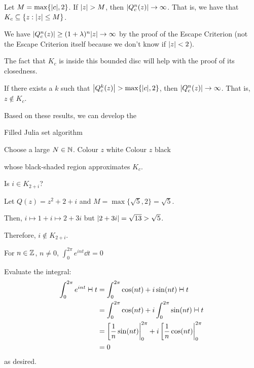 \documentclass[class=pmath370,tikz,notes]{agony}
\begin{document}
\begin{corollary}
  Let $M = \max\{\abs{c}, 2\}$.
  If $\abs{z} > M$, then $\abs{Q_c^n(z)} \to \infty$.
  That is, we have that $K_c \subseteq \{z : \abs{z} \leq M\}$.
\end{corollary}
\begin{prf}
  We have $\abs{Q_c^n(z)} \geq (1+\lambda)^n\abs{z} \to \infty$
  by the proof of the Escape Criterion
  (not the Escape Criterion itself because we don't know if $\abs{z} < 2$).
\end{prf}

\begin{remark}
  The fact that $K_c$ is inside this bounded disc will help with the proof of its closedness.
\end{remark}

\begin{corollary}
  If there exists a $k$ such that $\abs{Q_c^k(z)} > \max\{\abs{c}, 2\}$,
  then $\abs{Q_c^n(z)} \to \infty$.
  That is, $z \not\in K_c$.
\end{corollary}

Based on these results, we can develop the

\begin{algorithm}[H]
  \caption{Filled Julia set algorithm}
  \begin{algorithmic}[1]
    \State Choose a large $N \in \mathbb{N}$.
        \State Colour $z$ white
        \State Colour $z$ black
      \EndIf
    \EndFor
  \end{algorithmic}
\end{algorithm}

whose black-shaded region approximates $K_c$.

\begin{example}
  Is $i \in K_{2+i}$?
\end{example}
\begin{sol}
  Let $Q(z) = z^2 + 2 + i$ and $M = \max\{\sqrt5,2\} = \sqrt5$.

  Then, $i \mapsto 1 + i \mapsto 2 + 3i$ but $\abs{2+3i} = \sqrt{13} > \sqrt5$.

  Therefore, $i \not\in K_{2+i}$.
\end{sol}

\begin{remark}\label{rem:int}
  For $n \in \mathbb{Z}$, $n \neq 0$, $\int_0^{2\pi} e^{int} \dd{t} = 0$
\end{remark}
\begin{prf}
  Evaluate the integral:
  \begin{align*}
    \int_0^{2\pi} e^{int} \dd{t}
     & = \int_0^{2\pi} \cos(nt) + i\sin(nt) \dd{t}                          \\
     & = \int_0^{2\pi} \cos(nt) + i \int_0^{2\pi} \sin(nt) \dd{t}           \\
     & = \eval[\frac1n\sin(nt)|_0^{2\pi} + i\eval[\frac1n\cos(nt)|_0^{2\pi} \\
     & = 0
  \end{align*}
  as desired.
\end{prf}
\end{document}
